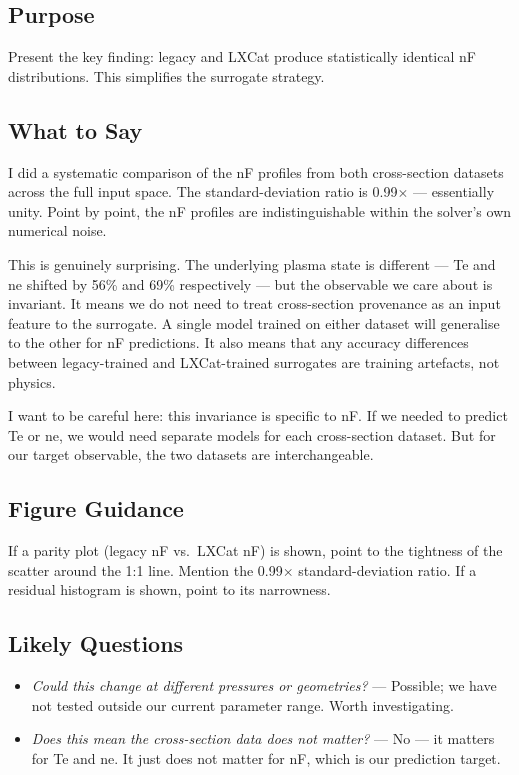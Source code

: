 \documentclass[12pt,a4paper]{article}
\begin{document}
\subsection*{Purpose}
Present the key finding: legacy and LXCat produce statistically
identical nF distributions. This simplifies the surrogate strategy.

\subsection*{What to Say}

I did a systematic comparison of the nF profiles from both
cross-section datasets across the full input space. The
standard-deviation ratio is 0.99$\times$ --- essentially unity.
Point by point, the nF profiles are indistinguishable within the
solver's own numerical noise.

This is genuinely surprising. The underlying plasma state is
different --- Te and ne shifted by 56\% and 69\% respectively ---
but the observable we care about is invariant. It means we do not
need to treat cross-section provenance as an input feature to the
surrogate. A single model trained on either dataset will generalise
to the other for nF predictions. It also means that any accuracy
differences between legacy-trained and LXCat-trained surrogates are
training artefacts, not physics.

I want to be careful here: this invariance is specific to nF. If we
needed to predict Te or ne, we would need separate models for each
cross-section dataset. But for our target observable, the two
datasets are interchangeable.

\subsection*{Figure Guidance}
If a parity plot (legacy nF vs.\ LXCat nF) is shown, point to the
tightness of the scatter around the 1:1 line. Mention the
0.99$\times$ standard-deviation ratio. If a residual histogram is
shown, point to its narrowness.

\subsection*{Likely Questions}
\begin{itemize}
  \item \emph{Could this change at different pressures or geometries?}
    --- Possible; we have not tested outside our current parameter
    range. Worth investigating.
  \item \emph{Does this mean the cross-section data does not matter?}
    --- No --- it matters for Te and ne. It just does not matter
    for nF, which is our prediction target.
\end{itemize}
\end{document}

